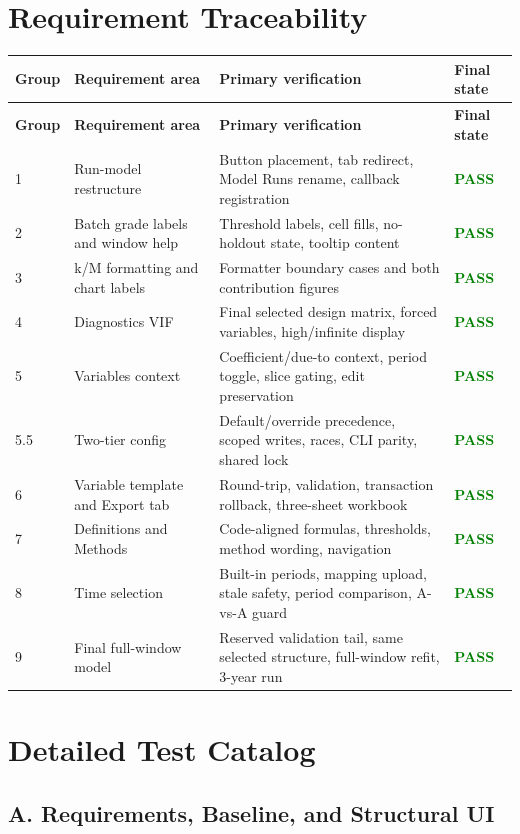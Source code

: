 \documentclass[11pt]{article}
\newcommand{\Pass}{\textcolor{green}{\textbf{PASS}}}
\begin{document}
\section{Requirement Traceability}

\begin{longtable}{L{1.4cm}L{5.0cm}L{6.6cm}L{2.4cm}}
\toprule
\textbf{Group} & \textbf{Requirement area} & \textbf{Primary verification} & \textbf{Final state}\\
\midrule
\endfirsthead
\toprule
\textbf{Group} & \textbf{Requirement area} & \textbf{Primary verification} & \textbf{Final state}\\
\midrule
{} & Run-model restructure & Button placement, tab redirect, Model Runs rename, callback registration & \Pass\\
2 & Batch grade labels and window help & Threshold labels, cell fills, no-holdout state, tooltip content & \Pass\\
3 & k/M formatting and chart labels & Formatter boundary cases and both contribution figures & \Pass\\
4 & Diagnostics VIF & Final selected design matrix, forced variables, high/infinite display & \Pass\\
5 & Variables context & Coefficient/due-to context, period toggle, slice gating, edit preservation & \Pass\\
5.5 & Two-tier config & Default/override precedence, scoped writes, races, CLI parity, shared lock & \Pass\\
6 & Variable template and Export tab & Round-trip, validation, transaction rollback, three-sheet workbook & \Pass\\
7 & Definitions and Methods & Code-aligned formulas, thresholds, method wording, navigation & \Pass\\
8 & Time selection & Built-in periods, mapping upload, stale safety, period comparison, A-vs-A guard & \Pass\\
9 & Final full-window model & Reserved validation tail, same selected structure, full-window refit, 3-year run & \Pass\\
\bottomrule
\end{longtable}

\section{Detailed Test Catalog}

\subsection{A. Requirements, Baseline, and Structural UI}
\end{document}
